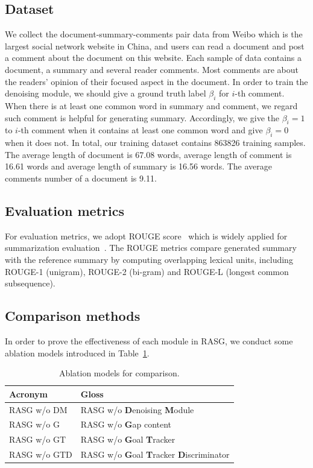 \documentclass[letterpaper]{article} %
\begin{document}
\subsection{Dataset}

We collect the document-summary-comments pair data from Weibo which is the largest social network website in China, and users can read a document and post a comment about the document on this website.
Each sample of data contains a document, a summary and several reader comments.
Most comments are about the readers' opinion of their focused aspect in the document.
In order to train the denoising module, we should give a ground truth label $\beta_i$ for $i$-th comment.
When there is at least one common word in summary and comment, we regard such comment is helpful for generating summary.
Accordingly, we give the $\beta_i = 1$ to $i$-th comment when it contains at least one common word and give $\beta_i = 0$ when it does not.
In total, our training dataset contains 863826 training samples.
The average length of document is 67.08 words, average length of comment is 16.61 words and average length of summary is 16.56 words.
The average comments number of a document is 9.11.

\subsection{Evaluation metrics}

For evaluation metrics, we adopt ROUGE score~\cite{lin2004rouge} which is widely applied for summarization evaluation~\cite{Sun2018AUM,chen2018iterative}. 
The ROUGE metrics compare generated summary with the reference summary by computing overlapping lexical units, including ROUGE-1 (unigram), ROUGE-2 (bi-gram) and ROUGE-L (longest common subsequence). 

\subsection{Comparison methods}

In order to prove the effectiveness of each module in RASG, we conduct some ablation models introduced in Table~\ref{tab:ablations}.

\begin{table}[t]
\centering
\caption{Ablation models for comparison.}
\label{tab:ablations}
\small
\begin{tabular}{@{}l@{~}l}
\toprule
Acronym & Gloss \\
\midrule
RASG w/o DM &  \multicolumn{1}{p{5cm}}{\small RASG w/o \textbf{D}enoising \textbf{M}odule}\\
RASG w/o G &  \multicolumn{1}{p{5cm}}{\small RASG w/o \textbf{G}ap content}\\
RASG w/o GT &  \multicolumn{1}{p{5cm}}{\small RASG w/o \textbf{G}oal \textbf{T}racker}\\
RASG w/o GTD &  \multicolumn{1}{p{5cm}}{\footnotesize RASG w/o \textbf{G}oal \textbf{T}racker \textbf{D}iscriminator}\\
\bottomrule
\end{tabular}
\end{table}
\end{document}
